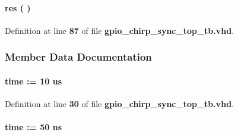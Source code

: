 \paragraph[{res}]{\setlength{\rightskip}{0pt plus 5cm} {\bfseries \textcolor{vhdlchar}{ }} res ( ) \hspace{0.3cm}{\ttfamily [Process]}}\label{classgpio__chirp__sync__top__tb_1_1arch_ab0bd7560790c13b656fd58e17e35143e}


Definition at line {\bf 87} of file {\bf gpio\+\_\+chirp\+\_\+sync\+\_\+top\+\_\+tb.\+vhd}.



\subsubsection{Member Data Documentation}
\paragraph[{chirp\+\_\+period}]{ {\bfseries \textcolor{comment}{time}\textcolor{vhdlchar}{ }\textcolor{vhdlchar}{ }\textcolor{vhdlchar}{\+:}\textcolor{vhdlchar}{=}\textcolor{vhdlchar}{ }\textcolor{vhdlchar}{ }\textcolor{vhdlchar}{ } \textcolor{vhdldigit}{10} \textcolor{vhdlchar}{ }\textcolor{vhdlchar}{us}\textcolor{vhdlchar}{ }} \hspace{0.3cm}{\ttfamily [Constant]}}\label{classgpio__chirp__sync__top__tb_1_1arch_af8e4677708b926e05d3efb9ad4dac482}


Definition at line {\bf 30} of file {\bf gpio\+\_\+chirp\+\_\+sync\+\_\+top\+\_\+tb.\+vhd}.

\paragraph[{clk\+\_\+period}]{ {\bfseries \textcolor{comment}{time}\textcolor{vhdlchar}{ }\textcolor{vhdlchar}{ }\textcolor{vhdlchar}{\+:}\textcolor{vhdlchar}{=}\textcolor{vhdlchar}{ }\textcolor{vhdlchar}{ }\textcolor{vhdlchar}{ } \textcolor{vhdldigit}{50} \textcolor{vhdlchar}{ }\textcolor{vhdlchar}{ns}\textcolor{vhdlchar}{ }} \hspace{0.3cm}{\ttfamily [Constant]}}\label{classgpio__chirp__sync__top__tb_1_1arch_aff849c5c82450208981c35b8779b5e95}


